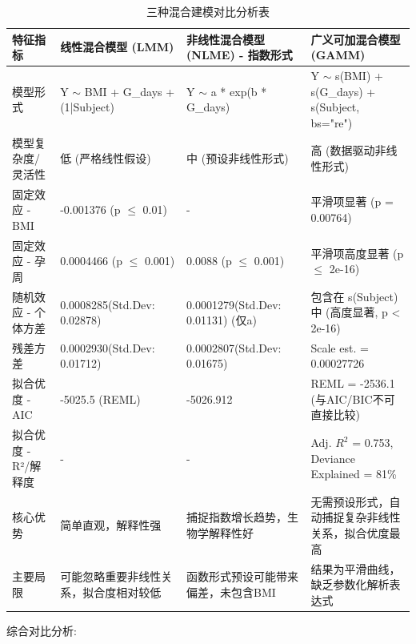 \documentclass{article}
\begin{document}
\begin{table}[htbp]
    \centering
    \setlength{\tabcolsep}{2pt}  %
    \small  %
    \caption{三种混合建模对比分析表}
    \renewcommand{\arraystretch}{1.5}  %
    \begin{tabularx}{\linewidth}{@{}X X X X@{}}  %
        \toprule
        特征指标          & 线性混合模型 (LMM)                         & 非线性混合模型 (NLME) - 指数形式            & 广义可加混合模型 (GAMM)                                    \\
        \midrule
        模型形式          & Y $\sim$ BMI + G\_days + (1|Subject) & Y $\sim$ a * exp(b * G\_days)    & Y $\sim$ s(BMI) + s(G\_days) + s(Subject, bs="re") \\
        模型复杂度/灵活性     & 低 (严格线性假设)                           & 中 (预设非线性形式)                      & 高 (数据驱动非线性形式)                                      \\
        固定效应 - BMI    & -0.001376 (p $\leq$ 0.01)            & -                                & 平滑项显著 (p = 0.00764)                                \\
        固定效应 - 孕周     & 0.0004466 (p $\leq$ 0.001)           & 0.0088 (p $\leq$ 0.001)          & 平滑项高度显著 (p $\leq$ 2e-16)                           \\
        随机效应 - 个体方差   & 0.0008285(Std.Dev: 0.02878)          & 0.0001279(Std.Dev: 0.01131) (仅a) & 包含在 s(Subject) 中 (高度显著, p < 2e-16)                 \\
        残差方差          & 0.0002930(Std.Dev: 0.01712)          & 0.0002807(Std.Dev: 0.01675)      & Scale est. = 0.00027726                            \\
        拟合优度 - AIC    & -5025.5 (REML)                       & -5026.912                        & REML = -2536.1 (与AIC/BIC不可直接比较)                    \\
        拟合优度 - R²/解释度 & -                                    & -                                & Adj. $R^2$ = 0.753, Deviance Explained = 81\%      \\
        核心优势          & 简单直观，解释性强                            & 捕捉指数增长趋势，生物学解释性好                 & 无需预设形式，自动捕捉复杂非线性关系，拟合优度最高                          \\
        主要局限          & 可能忽略重要非线性关系，拟合度相对较低                  & 函数形式预设可能带来偏差，未包含BMI              & 结果为平滑曲线，缺乏参数化解析表达式                                 \\
        \bottomrule
    \end{tabularx}
    \label{tab:model_comparison}
\end{table}
综合对比分析:
\end{document}
